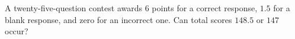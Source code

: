 A twenty-five-question contest awards $6$ points for a correct response, $1.5$ for a blank response, and zero for an incorrect one. Can total scores $148.5$ or $147$ occur?
